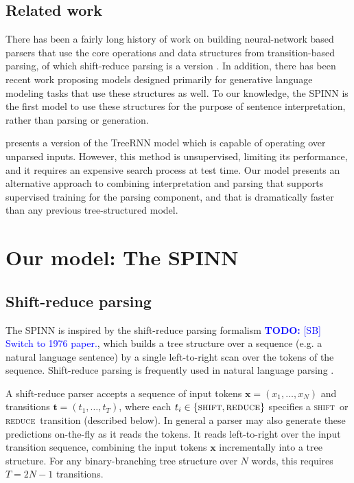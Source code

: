 \documentclass[11pt]{article}
\newcommand\todo[1]{\textcolor{blue}{\textbf{TODO:} #1}}
\newcommand{\shift}{\textsc{shift}}
\newcommand{\reduce}{\textsc{reduce}}
\begin{document}
\subsection{Related work}

There has been a fairly long history of work on building neural-network based parsers that use the core operations and data structures from transition-based parsing, of which shift-reduce parsing is a version \citep{henderson2004discriminative,emami2005neural,titov2010latent,chen2014,buys2generative,dyer-EtAl:2015:ACL-IJCNLP,kiperwasser2016easy}. In addition, there has been recent work \citep{zhang2016top,dyer2016rnn} proposing models designed primarily for generative language modeling tasks that use these structures as well. To our knowledge, the SPINN is the first model to use these structures for the purpose of sentence interpretation, rather than parsing or generation.

\citet{socher2011dynamic} presents a version of the TreeRNN model which is capable of operating over unparsed inputs. However, this method is unsupervised, limiting its performance, and it requires an expensive search process at test time. Our model presents an alternative approach to combining interpretation and parsing that supports supervised training for the parsing component, and that is dramatically faster than any previous tree-structured model. 

\section{Our model: The SPINN}

\subsection{Shift-reduce parsing}

The SPINN is inspired by the shift-reduce parsing formalism \citep{aho1986compilers} \todo{[SB] Switch to 1976 paper.}, which builds a tree structure over a sequence (e.g. a natural language sentence) by a single left-to-right scan over the tokens of the sequence. Shift-reduce parsing is frequently used in natural language parsing \citep[e.g.][]{nivre2003efficient}.

A shift-reduce parser accepts a sequence of input tokens $\mathbf x = (x_1, \dots, x_N)$ and transitions $\mathbf t = (t_1, \dots, t_T)$, where each $t_i \in \{\shift, \reduce\}$ specifies a \shift~or \reduce~transition (described below). In general a parser may also generate these predictions on-the-fly as it reads the tokens. It reads left-to-right over the input transition sequence, combining the input tokens $\mathbf x$ incrementally into a tree structure. For any binary-branching tree structure over $N$ words, this requires $T = 2N - 1$ transitions.
\end{document}
